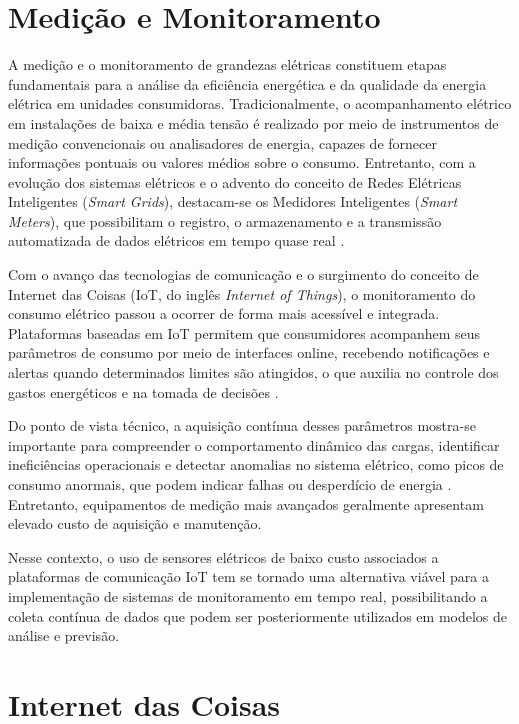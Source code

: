 \section{Medição e Monitoramento}
A medição e o monitoramento de grandezas elétricas constituem etapas fundamentais para a análise da eficiência energética e da qualidade da energia elétrica em unidades consumidoras. Tradicionalmente, o acompanhamento elétrico em instalações de baixa e média tensão é realizado por meio de instrumentos de medição convencionais ou analisadores de energia, capazes de fornecer informações pontuais ou valores médios sobre o consumo. Entretanto, com a evolução dos sistemas elétricos e o advento do conceito de Redes Elétricas Inteligentes (\textit{Smart Grids}), destacam-se os Medidores Inteligentes (\textit{Smart Meters}), que possibilitam o registro, o armazenamento e a transmissão automatizada de dados elétricos em tempo quase real \cite{MedidoresInteligentes}.

Com o avanço das tecnologias de comunicação e o surgimento do conceito de Internet das Coisas (IoT, do inglês \textit{Internet of Things}), o monitoramento do consumo elétrico passou a ocorrer de forma mais acessível e integrada. Plataformas baseadas em IoT permitem que consumidores acompanhem seus parâmetros de consumo por meio de interfaces online, recebendo notificações e alertas quando determinados limites são atingidos, o que auxilia no controle dos gastos energéticos e na tomada de decisões \cite{GerenciadorMedidorInteligente}. 

Do ponto de vista técnico, a aquisição contínua desses parâmetros mostra-se importante para compreender o comportamento dinâmico das cargas, identificar ineficiências operacionais e detectar anomalias no sistema elétrico, como picos de consumo anormais, que podem indicar falhas ou desperdício de energia \cite{Wang2018}. Entretanto, equipamentos de medição mais avançados geralmente apresentam elevado custo de aquisição e manutenção. 

Nesse contexto, o uso de sensores elétricos de baixo custo associados a plataformas de comunicação IoT tem se tornado uma alternativa viável para a implementação de sistemas de monitoramento em tempo real, possibilitando a coleta contínua de dados que podem ser posteriormente utilizados em modelos de análise e previsão.

\section{Internet das Coisas}

